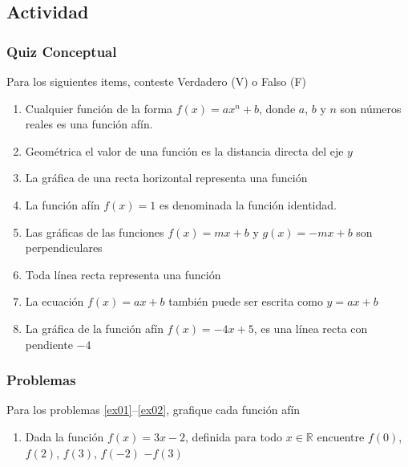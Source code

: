 \documentclass[letterpaper,11pt,twoside]{article}
\begin{document}
\begin{multicols}{2}
 \subsection*{Actividad}
 \subsubsection*{Quiz Conceptual}
 Para los siguientes items, conteste Verdadero (V) o Falso (F)
 \begin{enumerate}
 \item Cualquier función de la forma $f(x)=ax^{n}+b$, donde $a$, $b$ y $n$ son números reales es una función afín.
 \item Geométrica el valor de una función es la distancia directa del eje $y$
 \item La gráfica de una recta horizontal representa una función
 \item La función afín $f(x)=1$ es denominada la función identidad.
 \item Las gráficas de las funciones $f(x)=mx+b$ y $g(x)=-mx+b$ son perpendiculares
 \item Toda línea recta representa una función
 \item La ecuación $f(x)=ax+b$ también puede ser escrita como $y=ax+b$
 \item La gráfica de la función afín $f(x)=-4x+5$, es una línea recta con pendiente $-4$
 \end{enumerate}
 \subsubsection*{Problemas}
 Para los problemas \ref{ex01}--\ref{ex02}, grafique cada función afín
 \begin{enumerate}
 \item Dada la función $f(x)=3x-2$, definida para todo $x\in \mathbb{R}$ encuentre $f(0)$, $f(2)$, $f(3)$, $f(-2)$ $-f(3)$
 

\end{enumerate}
\end{multicols}
\end{document}
